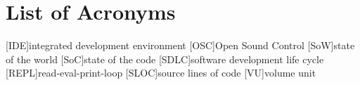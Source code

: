 
\chapter*{List of Acronyms}
\label{chap:acronyms}

\begin{acronym}
[IDE]{integrated development environment}
[OSC]{Open Sound Control}
[SoW]{state of the world}
[SoC]{state of the code}
[SDLC]{software development life cycle}
[REPL]{read-eval-print-loop}
[SLOC]{source lines of code}
[VU]{volume unit}
\end{acronym}